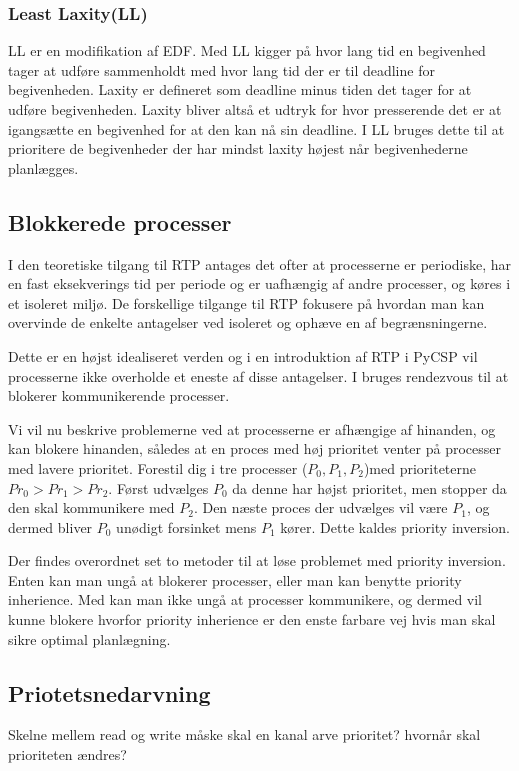 \subsubsection{Least Laxity(LL)}
LL er en modifikation af EDF. Med LL kigger på hvor lang tid en begivenhed tager at udføre sammenholdt med hvor lang tid der er til deadline for begivenheden. Laxity er defineret som deadline minus tiden det tager for at udføre begivenheden. Laxity bliver altså et udtryk for hvor presserende det er at igangsætte en begivenhed for at den kan nå sin deadline. I LL bruges dette til at prioritere de begivenheder der har mindst laxity højest når begivenhederne planlægges. 

\subsection{Blokkerede processer}
I den teoretiske tilgang til RTP antages det ofter at processerne er periodiske, har en fast eksekverings tid per periode og er uafhængig af andre processer, og køres i et isoleret miljø. De forskellige tilgange til RTP fokusere på hvordan man kan overvinde de enkelte antagelser ved isoleret og ophæve en af begrænsningerne.

Dette er en højst idealiseret verden og i en introduktion af RTP i PyCSP vil processerne ikke overholde et eneste af disse antagelser. 
I \pycsp bruges rendezvous til at blokerer kommunikerende  processer.

Vi vil nu beskrive problemerne ved at processerne er afhængige af hinanden, og kan blokere hinanden, således at en proces med høj prioritet venter på processer med lavere prioritet. Forestil dig i \pycsp tre processer ($P_0,P_1,P_2$)med prioriteterne $Pr_0>Pr_1>Pr_2$. Først udvælges $P_0$ da denne har højst prioritet, men stopper da den skal kommunikere med $P_2$. Den næste proces der udvælges vil være $P_1$, og dermed bliver $P_0$ unødigt forsinket mens $P_1$ kører. Dette kaldes priority inversion\cite{sha1990priority}.

Der findes overordnet set to metoder til at løse problemet med priority inversion. Enten kan man ungå at blokerer processer, eller man kan benytte priority inherience\cite{sha1990priority}. Med \pycsp kan man ikke ungå at processer kommunikere, og dermed vil kunne blokere hvorfor priority inherience er den enste farbare vej hvis man skal sikre optimal planlægning.

\subsection{Priotetsnedarvning}
Skelne mellem read og write
måske skal en kanal arve prioritet?
hvornår skal prioriteten ændres? 

